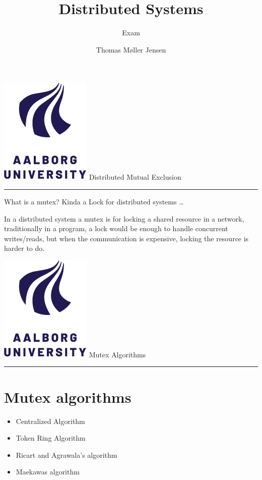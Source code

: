 \documentclass[aspectratio=1610,17pt,utf8]{beamer}
\title[DS]{Distributed Systems}
\subtitle{Exam}
\author[Thomas Møller Jensen]{Thomas Møller Jensen}
\institute[Institute of Computer Science]
{
  Aalborg University\\
}
\newcommand{\mainframe}[1]{\color{blue} \includegraphics[width=.05\textwidth]{figures/aau.png} #1\\\hrule}
\newcommand{\regularframe}[1]{\color{black}\includegraphics[width=.05\textwidth]{figures/aau.png} #1\\\hrule}
\begin{document}

\begin{frame}{\mainframe{Distributed Mutual Exclusion}}
    What is a mutex? Kinda a Lock for distributed systems \ldots

    In a distributed system a mutex is for locking a shared resource in a network, traditionally in a program, a lock would be enough to handle concurrent writes/reads, but when the communication is expensive, locking the resource is harder to do.
\end{frame}

\begin{frame}{\regularframe{Mutex Algorithms}}
    \section{Mutex algorithms}
    \begin{itemize}
        \item Centralized Algorithm
        \item Token Ring Algorithm
        \item Ricart and Agrawala's algorithm
        \item Maekawas algorithm
    \end{itemize}
\end{frame}
\end{document}
